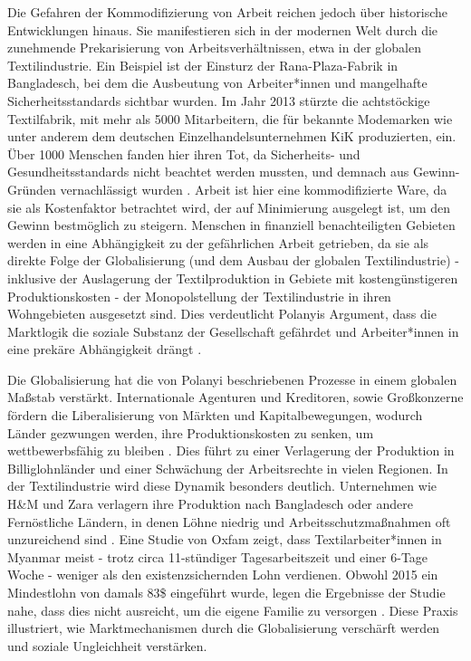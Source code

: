 \documentclass[12pt]{article}
\begin{document}
Die Gefahren der Kommodifizierung von Arbeit reichen jedoch über historische Entwicklungen hinaus. Sie manifestieren sich in der modernen Welt durch die zunehmende Prekarisierung von Arbeitsverhältnissen, etwa in der globalen Textilindustrie. Ein Beispiel ist der Einsturz der Rana-Plaza-Fabrik in Bangladesch, bei dem die Ausbeutung von Arbeiter*innen und mangelhafte Sicherheitsstandards sichtbar wurden. Im Jahr 2013 stürzte die achtstöckige Textilfabrik, mit mehr als 5000 Mitarbeitern, die für bekannte Modemarken wie unter anderem dem deutschen Einzelhandelsunternehmen KiK produzierten, ein. Über 1000 Menschen fanden hier ihren Tot, da Sicherheits- und Gesundheitsstandards nicht beachtet werden mussten, und demnach aus Gewinn-Gründen vernachlässigt wurden \autocite[vgl.][]{bildung_vor_2018}. Arbeit ist hier eine kommodifizierte Ware, da sie als Kostenfaktor betrachtet wird, der auf Minimierung ausgelegt ist, um den Gewinn bestmöglich zu steigern. Menschen in finanziell benachteiligten Gebieten werden in eine Abhängigkeit zu der gefährlichen Arbeit getrieben, da sie als direkte Folge der Globalisierung (und dem Ausbau der globalen Textilindustrie) - inklusive der Auslagerung der Textilproduktion in Gebiete mit kostengünstigeren Produktionskosten - der Monopolstellung der Textilindustrie in ihren Wohngebieten ausgesetzt sind. Dies verdeutlicht Polanyis Argument, dass die Marktlogik die soziale Substanz der Gesellschaft gefährdet und Arbeiter*innen in eine prekäre Abhängigkeit drängt \autocite[181]{ebner_karl_2021}.

Die Globalisierung hat die von Polanyi beschriebenen Prozesse in einem globalen Maßstab verstärkt. Internationale Agenturen und Kreditoren, sowie Großkonzerne fördern die Liberalisierung von Märkten und Kapitalbewegungen, wodurch Länder gezwungen werden, ihre Produktionskosten zu senken, um wettbewerbsfähig zu bleiben \autocite[vgl.][121]{polanyi_levitt_transformations_2019}. Dies führt zu einer Verlagerung der Produktion in Billiglohnländer und einer Schwächung der Arbeitsrechte in vielen Regionen.
In der Textilindustrie wird diese Dynamik besonders deutlich. Unternehmen wie H\&M und Zara verlagern ihre Produktion nach Bangladesch oder andere Fernöstliche Ländern, in denen Löhne niedrig und Arbeitsschutzmaßnahmen oft unzureichend sind \autocite[vgl.][]{che_berberich_dunkle_2016}. Eine Studie von Oxfam zeigt, dass Textilarbeiter*innen in Myanmar meist - trotz circa 11-stündiger Tagesarbeitszeit und einer 6-Tage Woche -  weniger als den existenzsichernden Lohn verdienen. Obwohl 2015 ein Mindestlohn von damals 83\$ eingeführt wurde, legen die Ergebnisse der Studie nahe, dass dies nicht ausreicht, um die eigene Familie zu versorgen \autocite[vgl.][]{oxfam_deutschland_textilindustrie_2015}. Diese Praxis illustriert, wie Marktmechanismen durch die Globalisierung verschärft werden und soziale Ungleichheit verstärken.
\end{document}
